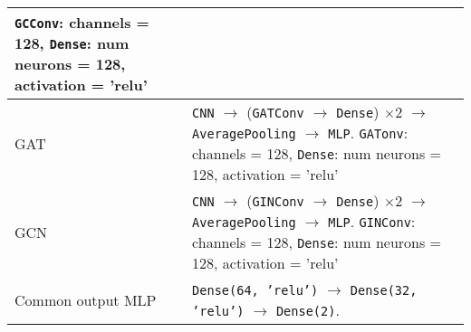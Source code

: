 \begin{tabular}{p{}p{}}
        \texttt{GCConv}: channels = 128, \texttt{Dense}: num neurons = 128, activation = 'relu' \\\hline
    GAT               &
        \texttt{CNN} $\to$ (\texttt{GATConv} $\to$ \texttt{Dense}) $\times 2$ $\to$ \texttt{AveragePooling} $\to$ \texttt{MLP}. \newline
        \texttt{GATonv}: channels = 128, \texttt{Dense}: num neurons = 128, activation = 'relu' \\\hline
    GCN               &
        \texttt{CNN} $\to$ (\texttt{GINConv} $\to$ \texttt{Dense}) $\times 2$ $\to$ \texttt{AveragePooling} $\to$ \texttt{MLP}. \newline
        \texttt{GINConv}: channels = 128, \texttt{Dense}: num neurons = 128, activation = 'relu' \\\hline
    Common output MLP & \texttt{Dense(64, 'relu')} $\to$ \texttt{Dense(32, 'relu')} $\to$ \texttt{Dense(2)}. \\ \bottomrule
\end{tabular}